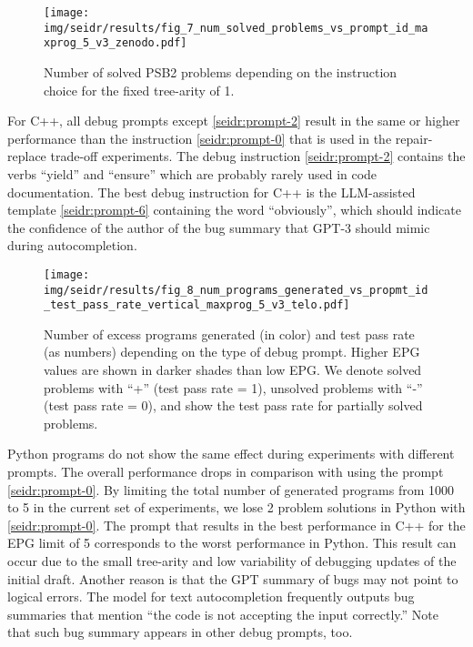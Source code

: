 \begin{figure}[tb]
  \centering
  \texttt{[image: img/seidr/results/fig\_7\_num\_solved\_problems\_vs\_prompt\_id\_maxprog\_5\_v3\_zenodo.pdf]}
  \caption{Number of solved PSB2 problems depending on the instruction choice for the fixed tree-arity of 1.}
  \label{fig:seidr:solved-vs-prompt-id}
\end{figure}

For C++, all debug prompts except \ref{seidr:prompt-2} result in the same or higher performance than the instruction \ref{seidr:prompt-0} that is used in the repair-replace trade-off experiments. 
The debug instruction \ref{seidr:prompt-2} contains the verbs ``yield'' and ``ensure'' which are probably rarely used in code documentation. 
The best debug instruction for C++ is the LLM-assisted template \ref{seidr:prompt-6} containing the word ``obviously'', which should indicate the confidence of the author of the bug summary that GPT-3 should mimic during autocompletion.



\begin{figure*}[t]
  \centering
  \texttt{[image: img/seidr/results/fig\_8\_num\_programs\_generated\_vs\_propmt\_id\_test\_pass\_rate\_vertical\_maxprog\_5\_v3\_telo.pdf]}
  \caption{Number of excess programs generated (in color) and test pass rate (as numbers) depending on the type of debug prompt. Higher EPG values are shown in darker shades than low EPG. We denote solved problems with ``+'' (test pass rate = 1), unsolved problems with ``-'' (test pass rate = 0), and show the test pass rate for partially solved problems. }
  \label{fig:seidr:epg-prompt-test}
  \vspace*{-3ex}
\end{figure*}

Python programs do not show the same effect during experiments with different prompts. 
The overall performance drops in comparison with using the prompt \ref{seidr:prompt-0}. 
By limiting the total number of generated programs from 1000 
to 5 in the current set of experiments, we lose 2 problem solutions in Python with \ref{seidr:prompt-0}. 
The prompt that results in the best performance in C++ for the EPG limit of 5 corresponds to the worst performance in Python. 
This result can occur due to the small tree-arity and low variability of debugging updates of the initial draft. 
Another reason is that the GPT summary of bugs may not point to logical errors. The model for text autocompletion frequently outputs bug summaries that mention ``the code is not accepting the input correctly.''
Note that such bug summary appears in other debug prompts, too. 

